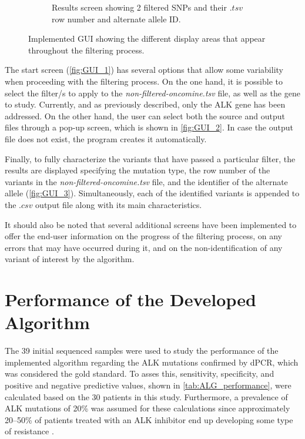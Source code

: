 \begin{figure}[ht]
\begin{subfigure}{0.52\textwidth}
        \caption{Results screen showing 2 filtered SNPs and their $.tsv$ row number and alternate allele ID.}
        \label{fig:GUI_3}
    \end{subfigure}
    \hfill
    \caption{Implemented GUI showing the different display areas that appear throughout the filtering process.}
    \label{fig:GUI}
\end{figure}

The start screen (\autoref{fig:GUI_1}) has several options that allow some variability when proceeding with the filtering process. On the one hand, it is possible to select the filter\slash s to apply to the \textit{non-filtered-oncomine.tsv} file, as well as the gene to study. Currently, and as previously described, only the ALK gene has been addressed. On the other hand, the user can select both the source and output files through a pop-up screen, which is shown in \autoref{fig:GUI_2}. In case the output file does not exist, the program creates it automatically.

Finally, to fully characterize the variants that have passed a particular filter, the results are displayed specifying the mutation type, the row number of the variants in the \textit{non-filtered-oncomine.tsv} file, and the identifier of the alternate allele (\autoref{fig:GUI_3}). Simultaneously, each of the identified variants is appended to the $.csv$ output file along with its main characteristics.

It should also be noted that several additional screens have been implemented to offer the end-user information on the progress of the filtering process, on any errors that may have occurred during it, and on the non-identification of any variant of interest by the algorithm.

\section{Performance of the Developed Algorithm}

The 39 initial sequenced samples were used to study the performance of the implemented algorithm regarding the ALK mutations confirmed by dPCR, which was considered the gold standard. To asses this, sensitivity, specificity, and positive and negative predictive values, shown in \autoref{tab:ALG_performance}, were calculated based on the 30 patients in this study. Furthermore, a prevalence of ALK mutations of 20\% was assumed for these calculations since approximately 20–50\% of patients treated with an ALK inhibitor end up developing some type of resistance \cite{TKI_resistance, ALK_resistance}. 

